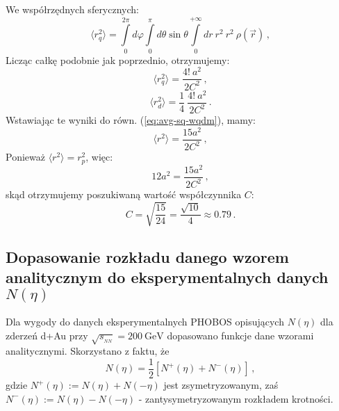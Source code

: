 \documentclass[a4paper,12pt]{article}
\begin{document}
\begin{itemize}
We współrzędnych sferycznych:
\[
\langle r_q^2 \rangle = \int\limits_{0}^{2\pi}d\varphi \int\limits_{0}^{\pi}d\theta \sin\theta \int\limits_{0}^{+\infty}dr \: r^2 \: r^2 \: \rho(\vec{r})\,,
\]
Licząc całkę podobnie jak poprzednio, otrzymujemy:
\begin{equation}
\langle r_q^2 \rangle = \frac{4! \: a^2}{2C^2}\,,
\end{equation}
\begin{equation}
\langle r_d^2 \rangle = \frac{1}{4}\: \frac{4! \: a^2}{2C^2}\,.
\end{equation}
Wstawiając te wyniki do równ. (\ref{eq:avg-sq-wqdm}), mamy:
\begin{equation}
\langle r^2 \rangle = \frac{15 a^2}{2C^2}\,,
\end{equation}
Ponieważ $\langle r^2 \rangle = r_p^2$, więc:
\[ 12a^2 = \frac{15 a^2}{2C^2}\,,  \]
skąd otrzymujemy poszukiwaną wartość współczynnika $C$:
\begin{equation}
C= \sqrt{\frac{15}{24}} = \frac{\sqrt{10}}{4} \approx 0.79\,.
\end{equation}
\end{itemize}


\subsection{Dopasowanie rozkładu danego wzorem analitycznym do eksperymentalnych danych $N(\eta)$} \label{fity}
Dla wygody do danych eksperymentalnych PHOBOS opisujących $N(\eta)$ dla zderzeń d+Au przy $\sqrt{s_{_{NN}}} = 200~\text{GeV}$ \cite{Back:2004mr} dopasowano funkcje dane wzorami analitycznymi. Skorzystano z faktu, że
\begin{equation}
N(\eta) = \frac{1}{2}\left[N^+(\eta) + N^-(\eta)\right]\,,
\end{equation}
gdzie $N^+(\eta) := N(\eta)+N(-\eta)$ jest zsymetryzowanym, zaś $N^-(\eta) := N(\eta)-N(-\eta)$ - zantysymetryzowanym rozkładem krotności.
\end{document}
